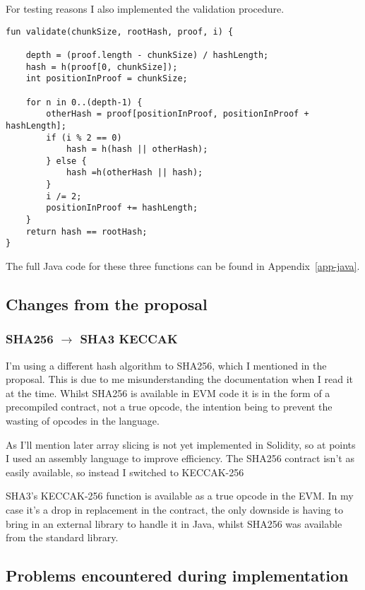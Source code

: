 \documentclass[10pt,twoside,a4paper]{article}
\begin{document}
For testing reasons I also implemented the validation procedure.

\begin{lstlisting}
fun validate(chunkSize, rootHash, proof, i) {
    
    depth = (proof.length - chunkSize) / hashLength;
    hash = h(proof[0, chunkSize]);
    int positionInProof = chunkSize;
    
    for n in 0..(depth-1) {
        otherHash = proof[positionInProof, positionInProof + hashLength];
        if (i % 2 == 0)
            hash = h(hash || otherHash);
        } else {
            hash =h(otherHash || hash);
        }
        i /= 2;
        positionInProof += hashLength;
    }
    return hash == rootHash;
}
\end{lstlisting}

The full Java code for these three functions can be found in Appendix~\ref{app-java}.

\subsection{Changes from the proposal}

\subsubsection{SHA256 $\to$ SHA3 KECCAK}

I'm using a different hash algorithm to SHA256, which I mentioned in the proposal.
This is due to me misunderstanding the documentation when I read it at the time.
Whilst SHA256 is available in EVM code it is in the form of a precompiled contract, not a true opcode,
the intention being to prevent the wasting of opcodes in the language.

As I'll mention later array slicing is not yet implemented in Solidity, so at points I
used an assembly language to improve efficiency.
The SHA256 contract isn't as easily available, so instead I switched to KECCAK-256

SHA3's KECCAK-256 function is available as a true opcode in the EVM.
In my case it's a drop in replacement in the contract, the only downside is having to bring in an external library
to handle it in Java, whilst SHA256 was available from the standard library.


\subsection{Problems encountered during implementation}
\end{document}

